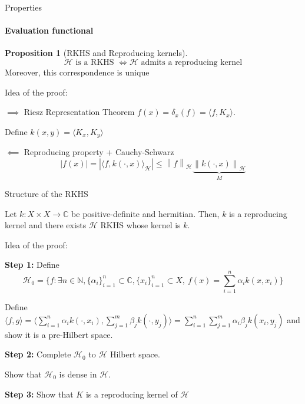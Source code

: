 \documentclass[10pt]{beamer}
\theoremstyle{definition} %
\newtheorem*{proposition}{Proposition} %
\newcommand{\norm}[1]{\left\lVert#1\right\rVert}
\begin{document}
\begin{frame}{Properties}
\framesubtitle{Evaluation functional}

\begin{proposition}[RKHS and Reproducing kernels]
$$\mathcal{H} \text{ is a RKHS } \iff \mathcal{H} \text{ admits a reproducing kernel}$$
Moreover, this correspondence is unique
\end{proposition}
{\setlength{\parskip}{1pt}
Idea of the proof:

$\implies$ Riesz Representation Theorem $f(x) = \delta_x(f) = \langle f, K_x \rangle$.

Define $k(x,y) = \langle K_x, K_y\rangle$

$\impliedby$ Reproducing property + Cauchy-Schwarz
\[
|f(x)| =|\langle f, k(\cdot, x) \rangle_\mathcal{H}| \leq \norm{f}_\mathcal{H} \underbrace{\norm{k(\cdot, x)}_\mathcal{H}}_{M}
\]
}

\end{frame}
\begin{frame}{Structure of the RKHS}
\begin{theorem}
Let $k: X \times X \to \mathbb{C}$ be positive-definite and hermitian. Then, $k$ is a reproducing kernel and there exists $\mathcal{H}$ RKHS whose kernel is $k$.
\end{theorem}
{\setlength{\parskip}{1pt}
Idea of the proof:

\textbf{Step 1:} Define $$\mathcal{H}_0 = \{f : \exists n \in \mathbb{N}, \{\alpha_i\}_{i=1}^n \subset \mathbb{C}, \{x_i\}_{i=1}^n \subset X, \ f(x) = \sum_{i=1}^n \alpha_i k(x, x_i)\}$$

Define $\langle f, g \rangle = \langle \sum_{i=1}^n \alpha_i k(\cdot, x_i), \sum_{j=1}^m \beta_j k(\cdot, y_j) \rangle = \sum_{i=1}^n \sum_{j=1}^m \alpha_i \beta_j k(x_i, y_j)$  and show it is a pre-Hilbert space.

\textbf{Step 2:}
Complete $\mathcal{H}_0$ to $\mathcal{H}$ Hilbert space.

Show that $\mathcal{H}_0$ is dense in $\mathcal{H}$.

\textbf{Step 3:}
Show that $K$ is a reproducing kernel of $\mathcal{H}$
}
\end{frame}
\end{document}
